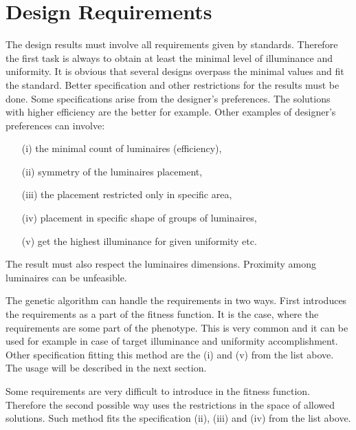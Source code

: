 \section{Design Requirements}
The design results must involve all requirements given by standards. Therefore the first task is always to obtain at least the minimal level of illuminance and uniformity. It is obvious that several designs overpass the minimal values and fit the standard. Better specification and other restrictions for the results must be done. Some specifications arise from the designer's preferences. The solutions with higher efficiency are the better for example. Other examples of designer's preferences can involve:

\begin{enumerate}
	\item[(i)] the minimal count of luminaires (efficiency),
	\item[(ii)] symmetry of the luminaires placement,
	\item[(iii)] the placement restricted only in specific area,
	\item[(iv)] placement in specific shape of groups of luminaires,
	\item[(v)] get the highest illuminance for given uniformity etc.
\end{enumerate}

The result must also respect the luminaires dimensions. Proximity among luminaires can be unfeasible.

The genetic algorithm can handle the requirements in two ways. First introduces the requirements as a part of the fitness function. It is the case, where the requirements are some part of the phenotype. This is very common and it can be used for example in case of target illuminance and uniformity accomplishment. Other specification fitting this method are the (i) and (v) from the list above. The usage will be described in the next section. 

Some requirements are very difficult to introduce in the fitness function. Therefore the second possible way uses the restrictions in the space of allowed solutions. Such method fits the specification (ii), (iii) and (iv) from the list above.